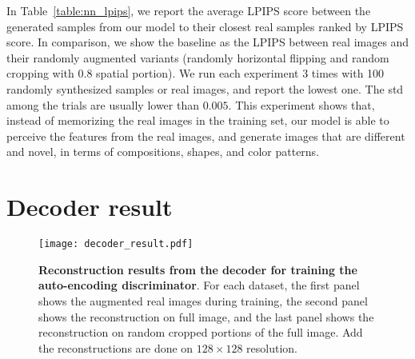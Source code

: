 \documentclass{article} \usepackage{iclr2021_conference,times}
\begin{document}
In Table~\ref{table:nn_lpips}, we report the average LPIPS score between the generated samples from our model to their closest real samples ranked by LPIPS score. In comparison, we show the baseline as the LPIPS between real images and their randomly augmented variants (randomly horizontal flipping and random cropping with $0.8$ spatial portion). We run each experiment 3 times with 100 randomly synthesized samples or real images, and report the lowest one. The std among the trials are usually lower than $0.005$. This experiment shows that, instead of memorizing the real images in the training set, our model is able to perceive the features from the real images, and generate images that are different and novel, in terms of compositions, shapes, and color patterns. 
\clearpage

\section{Decoder result}

\begin{figure}[h]
\vspace{-2mm}
\centering
\texttt{[image: decoder\_result.pdf]}
\caption{\textbf{Reconstruction results from the decoder for training the auto-encoding discriminator}. For each dataset, the first panel shows the augmented real images during training, the second panel shows the reconstruction on full image, and the last panel shows the reconstruction on random cropped portions of the full image. Add the reconstructions are done on $128\times128$ resolution. }
\label{fig:decoder_recon}
\end{figure}
\end{document}
